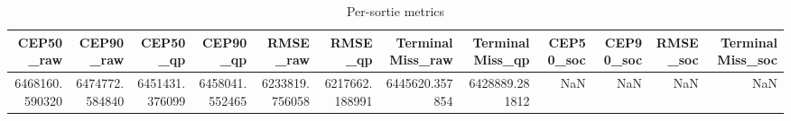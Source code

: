 \begin{table}[t]
\centering
\begin{tabular}{rrrrrrrrrrrr}
\toprule
CEP50_raw & CEP90_raw & CEP50_qp & CEP90_qp & RMSE_raw & RMSE_qp & TerminalMiss_raw & TerminalMiss_qp & CEP50_soc & CEP90_soc & RMSE_soc & TerminalMiss_soc \\
\midrule
6468160.590320 & 6474772.584840 & 6451431.376099 & 6458041.552465 & 6233819.756058 & 6217662.188991 & 6445620.357854 & 6428889.281812 & NaN & NaN & NaN & NaN \\
\bottomrule
\end{tabular}
\caption{Per-sortie metrics}
\label{tab:per_sortie}
\end{table}

